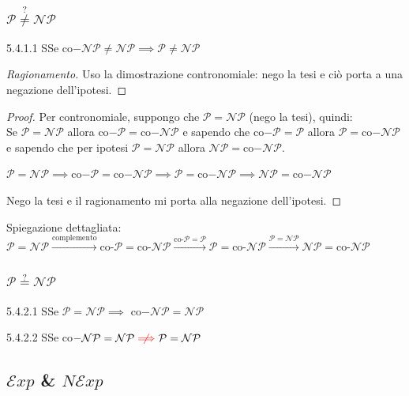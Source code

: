 \documentclass{article}  %
\theoremstyle{definition}
\newenvironment{ragionamento}[1][]
  {\begin{proof}[Ragionamento#1]\renewcommand{\qedsymbol}{}\normalfont}
  {\end{proof}}
\begin{document}
\subsubsection{$\mathcal{P} \overset{?}{\neq} \mathcal{NP}$}
\begin{theorem}{5.4.1.1}
	SSe co$-\mathcal{NP} \neq \mathcal{NP} \implies \mathcal{P} \neq \mathcal{NP}$
	\footnotesize
	\begin{ragionamento}
		Uso la dimostrazione contronomiale: nego la tesi e ciò porta a una negazione dell'ipotesi.
	\end{ragionamento}
	\begin{proof}
		Per contronomiale, suppongo che $\mathcal{P}=\mathcal{NP}$ (nego la tesi), quindi: \\
		Se $\mathcal{P}=\mathcal{NP}$ allora co$-\mathcal{P}=$co$-\mathcal{NP}$ e sapendo che co$-\mathcal{P}=\mathcal{P}$
		allora $\mathcal{P}=$co$-\mathcal{NP}$ e sapendo che per ipotesi $\mathcal{P}=\mathcal{NP}$ allora $\mathcal{NP}=$co$-\mathcal{NP}$.\\
		\begin{center}
			$\mathcal{P}=\mathcal{NP}\implies$co$-\mathcal{P}=$co$-\mathcal{NP}\implies\mathcal{P}=$co$-\mathcal{NP}\implies\mathcal{NP}=$co$-\mathcal{NP}$
		\end{center}
		Nego la tesi e il ragionamento mi porta alla negazione dell'ipotesi.
	\end{proof}
	Spiegazione dettagliata: \\
	$		\mathcal{P} = \mathcal{NP}
		\xrightarrow{\text{complemento}}
		\text{co-}\mathcal{P} = \text{co-}\mathcal{NP}
		\xrightarrow{\text{co-}\mathcal{P} = \mathcal{P}}
		\mathcal{P} = \text{co-}\mathcal{NP}
		\xrightarrow{\mathcal{P}=\mathcal{NP}}
		\mathcal{NP} = \text{co-}\mathcal{NP}$
\end{theorem}
\subsubsection{$\mathcal{P} \overset{?}{=} \mathcal{NP}$}
\begin{theorem}{5.4.2.1}
	SSe $\mathcal{P}=\mathcal{NP} \implies$ co$-\mathcal{NP}=\mathcal{NP}$
\end{theorem}
\begin{theorem}{5.4.2.2}
	SSe co$-\mathcal{NP}=\mathcal{NP} \textcolor{red}{\centernot\implies} \mathcal{P}=\mathcal{NP}$
\end{theorem}
\subsection{$\mathcal{E}xp$ \& $N \mathcal{E}xp$}
\break
\end{document}
